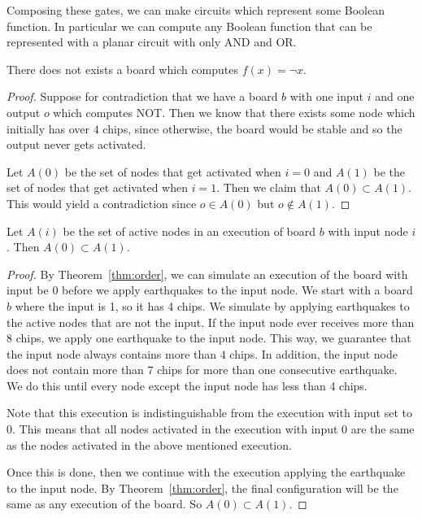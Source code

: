 \documentclass[runningheads,a4paper]{llncs}
\begin{document}
Composing these gates, we can make circuits which represent some Boolean function. In particular we can compute any Boolean function that can be represented with a planar circuit with only AND and OR.

\begin{theorem}
There does not exists a board which computes $f(x) = \neg x$.
\end{theorem}

\begin{proof}
Suppose for contradiction that we have a board $b$ with one input $i$ and one output $o$ which computes NOT. Then we know that there exists some node which initially has over $4$ chips, since otherwise, the board would be stable and so the output never gets activated. 

Let $A(0)$ be the set of nodes that get activated when $i = 0$ and $A(1)$ be the set of nodes that get activated when $i=1$. Then we claim that $A(0) \subset A(1)$. This would yield a contradiction since $o \in A(0)$ but $o \notin A(1)$. 
\end{proof}

\begin{lemma}
Let $A(i)$ be the set of active nodes in an execution of board $b$ with input node $i$. Then $A(0) \subset A(1)$.
\end{lemma}

\begin{proof}
By Theorem~\ref{thm:order}, we can simulate an execution of the board with input be 0 before we apply earthquakes to the input node. We start with a board $b$ where the input is 1, so it has 4 chips. We simulate by applying earthquakes to the active nodes that are not the input. If the input node ever receives more than $8$ chips, we apply one earthquake to the input node. This way, we guarantee that the input node always contains more than $4$ chips. In addition, the input node does not contain more than $7$ chips for more than one consecutive earthquake.
We do this until every node except the input node has less than 4 chips.

Note that this execution is indistinguishable from the execution with input set to 0. This means that all nodes activated in the execution with input 0 are the same as the nodes activated in the above mentioned execution. 

Once this is done, then we continue with the execution applying the earthquake to the input node. By Theorem~\ref{thm:order}, the final configuration will be the same as any execution of the board. So $A(0) \subset A(1)$.
\end{proof}
\end{document}
